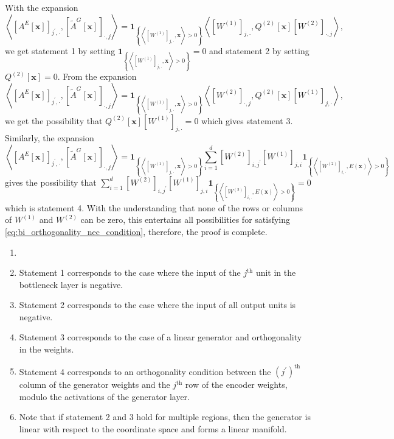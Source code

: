 \begin{tproof}
    With the expansion $$\left\langle\left[A^E[\mathbf{x}]\right]_{j^\prime,\cdot},\left[\tilde{A}^G[\mathbf{x}]\right]_{\cdot,j}\right\rangle=\mathbf{1}_{\left\{\left\langle\left[W^{(1)}\right]_{j,\cdot},\mathbf{x}\right\rangle>0\right\}}\left\langle\left[W^{(1)}\right]_{j,\cdot},Q^{(2)}[\mathbf{x}]\left[W^{(2)}\right]_{\cdot,j}\right\rangle,$$we get statement 1 by setting $\mathbf{1}_{\left\{\left\langle\left[W^{(1)}\right]_{j,\cdot},\mathbf{x}\right\rangle>0\right\}}=0$ and statement 2 by setting $Q^{(2)}[\mathbf{x}]=0$. From the expansion $$\left\langle\left[A^E[\mathbf{x}]\right]_{j^\prime,\cdot},\left[\tilde{A}^G[\mathbf{x}]\right]_{\cdot,j}\right\rangle=\mathbf{1}_{\left\{\left\langle\left[W^{(1)}\right]_{j,\cdot},\mathbf{x}\right\rangle>0\right\}}\left\langle\left[W^{(2)}\right]_{\cdot,j},Q^{(2)}[\mathbf{x}]\left[W^{(1)}\right]_{j,\cdot}\right\rangle,$$we get the possibility that $Q^{(2)}[\mathbf{x}]\left[W^{(1)}\right]_{j,\cdot}=0$ which gives statement 3. Similarly, the expansion $$\left\langle\left[A^E[\mathbf{x}]\right]_{j^\prime,\cdot},\left[\tilde{A}^G[\mathbf{x}]\right]_{\cdot,j}\right\rangle=\mathbf{1}_{\left\{\left\langle\left[W^{(1)}\right]_{j,\cdot},\mathbf{x}\right\rangle>0\right\}}\sum_{i=1}^d\left[W^{(2)}\right]_{i,j^\prime}\left[W^{(1)}\right]_{j,i}\mathbf{1}_{\left\{\left\langle\left[W^{(2)}\right]_{i,\cdot},E(\mathbf{x})\right\rangle>0\right\}}$$gives the possibility that $\sum_{i=1}^d\left[W^{(2)}\right]_{i,j^\prime}\left[W^{(1)}\right]_{j,i}\mathbf{1}_{\left\{\left\langle\left[W^{(2)}\right]_{i,\cdot},E(\mathbf{x})\right\rangle>0\right\}}=0$ which is statement 4. With the understanding that none of the rows or columns of $W^{(1)}$ and $W^{(2)}$ can be zero, this entertains all possibilities for satisfying \eqref{eq:bi_orthogonality_nec_condition}, therefore, the proof is complete.
\end{tproof}

\begin{remark}
    \begin{enumerate}
        \item[]
        \item Statement 1 corresponds to the case where the input of the $j^\text{th}$ unit in the bottleneck layer is negative.
        \item Statement 2 corresponds to the case where the input of all output units is negative.
        \item Statement 3 corresponds to the case of a linear generator and orthogonality in the weights.
        \item Statement 4 corresponds to an orthogonality condition between the $\left(j^\prime\right)^\text{th}$ column of the generator weights and the $j^\text{th}$ row of the encoder weights, modulo the activations of the generator layer.
        \item Note that if statement 2 and 3 hold for multiple regions, then the generator is linear with respect to the coordinate space and forms a linear manifold.
    \end{enumerate}
\end{remark}

